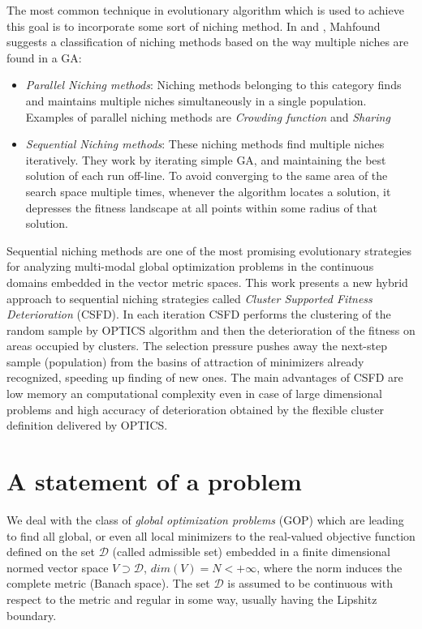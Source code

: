 The most common technique in evolutionary algorithm which is
used to achieve this goal is to incorporate some sort of niching method.
In \cite{Mahfound95niching} and \cite{Mahfoud95acomparison}, Mahfound 
suggests a classification of niching methods based on the way multiple niches
are found in a GA:
\begin{itemize}
  \item \textit{Parallel Niching methods}: Niching methods belonging to this
  category finds and maintains multiple niches simultaneously in a single population. 
  Examples of parallel niching methods are \textit{Crowding function} and
  \textit{Sharing}
  \item \textit{Sequential Niching methods}: These niching methods find multiple
  niches iteratively. They work by iterating simple GA, and maintaining the
  best solution of each run off-line. To avoid converging to the same area of the
  search space multiple times, whenever the algorithm locates a solution, it
  depresses the fitness landscape at all points within some radius of that
  solution.
\end{itemize}
Sequential niching methods are one of the most promising evolutionary strategies
for analyzing multi-modal global optimization problems in the continuous
domains embedded in the vector metric spaces. This work presents a new hybrid
approach to sequential niching strategies called \textit{Cluster Supported Fitness
Deterioration} (CSFD).
In each iteration CSFD performs the clustering of the random sample 
by OPTICS algorithm and then the deterioration of the fitness
on areas occupied by clusters. The selection pressure pushes away
the next-step sample (population) from the basins of attraction
of minimizers already recognized, speeding up finding of new ones.
The main advantages of CSFD are low memory an computational complexity
even in case of large dimensional problems and high accuracy
of deterioration obtained by the flexible cluster definition 
delivered by OPTICS.

\section{A statement of a problem}
\label{sec:statementOfProblem}

We deal with the class of \textit{global optimization problems} (GOP)
which are leading to find all global, or even all local minimizers 
to the real-valued objective function defined on the set $\mathcal{D}$ 
(called admissible set) embedded
in a finite dimensional normed vector space $V \supset \mathcal{D}$, 
$dim(V) = N < +\infty$, where the norm
induces the complete metric (Banach space). The set $\mathcal{D}$
is assumed to be continuous with respect to the metric and regular
in some way, usually having the Lipshitz boundary.

